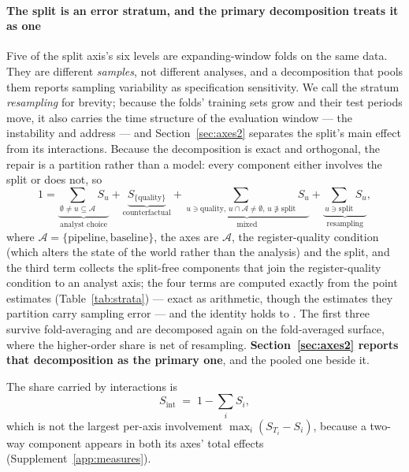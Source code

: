 \paragraph{The split is an error stratum, and the primary decomposition treats
it as one}
Five of the split axis's six levels are expanding-window folds on the same
data. They are different \emph{samples}, not different analyses, and a
decomposition that pools them reports sampling variability as specification
sensitivity. We call the stratum \emph{resampling} for brevity; because the
folds' training sets grow and their test periods move, it also carries the
time structure of the evaluation window --- the instability
\citet{giacomini2010unstable} and \citet{rossi2012window} address ---
and Section~\ref{sec:axes2} separates the split's main effect from its
interactions. Because the decomposition is exact and orthogonal, the repair is
a partition rather than a model: every component either involves the split or
does not, so
\begin{equation}
\label{eq:strata}
1 = \underbrace{\textstyle\sum_{\emptyset \neq u \subseteq \mathcal{A}} S_u}_{\text{analyst choice}}
+ \underbrace{S_{\{\text{quality}\}}}_{\text{counterfactual}}
+ \underbrace{\textstyle\sum_{u \ni \text{quality},\, u \cap \mathcal{A} \neq \emptyset,\, u \not\ni \text{split}} S_u}_{\text{mixed}}
+ \underbrace{\textstyle\sum_{u \ni \text{split}} S_u}_{\text{resampling}},
\end{equation}
where $\mathcal{A} = \{\text{pipeline}, \text{baseline}\}$, the axes are
$\mathcal{A}$, the register-quality condition (which alters the state of the
world rather than the analysis) and the split, and the third term collects
the split-free components that join the register-quality condition to an
analyst axis; the four terms are computed exactly from the point estimates
(Table~\ref{tab:strata}) --- exact as arithmetic, though the estimates they
partition carry sampling error --- and the identity holds to \stratumPartitionError.
The first three survive fold-averaging and are decomposed again on the
fold-averaged surface, where the higher-order share is net of resampling.
\textbf{Section~\ref{sec:axes2} reports that decomposition as the primary
one}, and the pooled one beside it.

The share carried by interactions is
\begin{equation}
\label{eq:inttotal}
S_{\mathrm{int}} \;=\; 1 - \sum_i S_i ,
\end{equation}
which is not the largest per-axis involvement $\max_i (S_{T_i} - S_i)$,
because a two-way component appears in both its axes' total effects
(Supplement~\ref{app:measures}).

